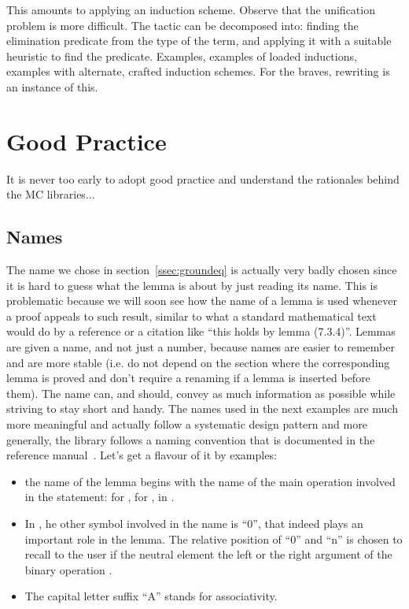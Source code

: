 This amounts to applying an induction scheme. Observe that the
unification problem is more difficult. The 
tactic can be decomposed into: finding the elimination predicate from
the type of the term, and applying it with a suitable heuristic to
find the predicate. Examples, examples of loaded inductions, examples
with alternate, crafted induction schemes. For the braves, rewriting
is an instance of this.



\section{Good Practice}\label{sec:goodprac}
It is never too early to adopt good practice and understand the
rationales behind the MC libraries...

\subsection{Names}
 The name  we chose in
section~\ref{ssec:groundeq} is actually very badly chosen since it is
hard to guess what the lemma is about by just reading its name.
This is problematic because we will soon see how the name of a lemma
is used whenever a proof appeals to such result,
similar to what a standard mathematical text would do by a reference or
a citation like ``this holds by lemma (7.3.4)''.  Lemmas are given a name,
and not just a number, because names are easier to remember and are more
stable (i.e. do not depend on the section where the corresponding lemma
is proved and don't require a renaming if a lemma is inserted before them).
The name can, and should, convey as much information as possible while
striving to stay short and handy. The
names used in the next examples are much more meaningful and actually
follow a systematic design pattern and more generally, the \mcbMC{}
library follows a naming convention that is documented in the
reference manual~\cite{ssrman}. Let's get a flavour of it by examples:

\begin{itemize}
\item the name of the lemma begins with the name of the main operation
  involved in the statement:  for ,  for
  ,  in .
\item In , he other symbol involved in the name is ``0'',
that indeed plays an important role in the lemma.  The relative position
of ``0'' and ``n'' is chosen to recall to the user if the neutral element
 the left or the right argument of the binary operation .
\item The capital letter suffix ``A'' stands for associativity.
\end{itemize}

